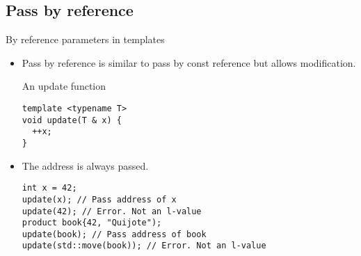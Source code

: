 \subsection{Pass by reference}

\begin{frame}[t,fragile]{By reference parameters in templates}
\begin{itemize}
  \item Pass by reference is similar to pass by const reference but allows
        modification.
\begin{block}{An update function}
\begin{lstlisting}
template <typename T>
void update(T & x) {
  ++x;
}
\end{lstlisting}
\end{block}

  \item The address is always passed.
\begin{lstlisting}
int x = 42;
update(x); // Pass address of x
update(42); // Error. Not an l-value
product book{42, "Quijote"); 
update(book); // Pass address of book
update(std::move(book)); // Error. Not an l-value
\end{lstlisting}

\end{itemize}
\end{frame}

